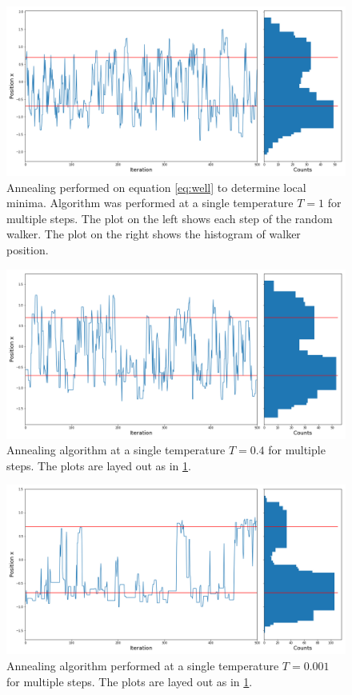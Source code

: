 \message{ !name(Assn1.tex)}\documentclass[twocolumn]{article}
\begin{document}
\begin{figure}
\centering
\includegraphics[width=\linewidth]{annealT1}
\caption{Annealing performed on equation \ref{eq:well} to determine local minima. Algorithm was performed at a single temperature $T=1$ for multiple steps. The plot on the left shows each step of the random walker. The plot on the right shows the histogram of walker position.}
\label{fig:annealT1}
\end{figure}

\begin{figure}
	\centering
	\includegraphics[width=\linewidth]{annealT04}
	\caption{Annealing algorithm at a single temperature $T=0.4$ for multiple steps. The plots are layed out as in \ref{fig:annealT1}.}
	\label{fig:annealT04}
\end{figure}

\begin{figure}
\centering
\includegraphics[width=\linewidth]{annealT01}
\caption{Annealing algorithm performed at a single temperature $T=0.001$ for multiple steps. The plots are layed out as in \ref{fig:annealT1}.}
\label{fig:annealT01}
\end{figure}
\end{document}
